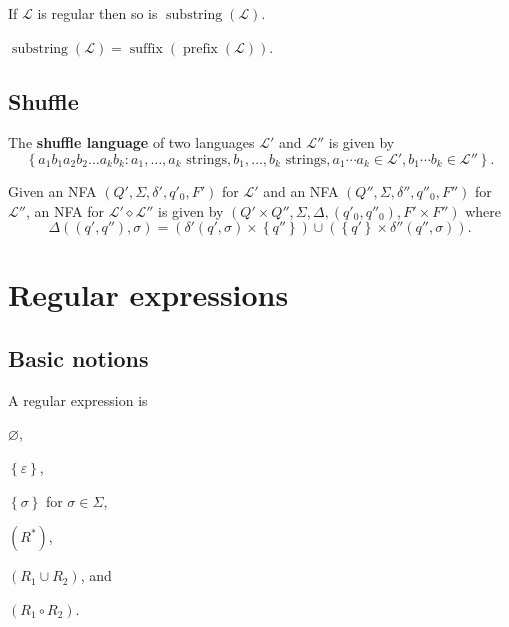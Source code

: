\documentclass{notes}
\begin{document}
\begin{thm}
  If $\mathcal L$ is regular then so is $\operatorname{substring}(\mathcal L)$.
\end{thm}

\begin{prf}
  $\operatorname{substring}(\mathcal L) = \operatorname{suffix}(\operatorname{prefix}(\mathcal L))$.
\end{prf}

\subsection{Shuffle}

\begin{defn}
  The {\boldmath \bfseries shuffle language} of two languages $\mathcal L'$ and $\mathcal L''$ is given by 
  \[
    \left \{ a_1 b_1 a_2 b_2 \dots a_k b_k : a_1, \dots, a_k \text{ strings}, b_1, \dots, b_k \text{ strings}, a_1 \cdots a_k \in \mathcal L', b_1 \cdots b_k \in \mathcal L'' \right \}.
  \]
\end{defn}

\begin{prf}
  Given an NFA $(Q', \Sigma, \delta', q'_0, F')$ for $\mathcal L'$ and an NFA $(Q'', \Sigma, \delta'', q''_0, F'')$ for $\mathcal L''$, an NFA for $\mathcal L' \diamond \mathcal L''$ is given by $(Q' \times Q'', \Sigma, \Delta, (q'_0, q''_0), F' \times F'')$ where 
  \[
    \Delta((q', q''), \sigma) = \left ( \delta'(q', \sigma) \times \left \{ q'' \right \} \right ) \cup \left ( \left \{ q' \right \} \times \delta''(q'', \sigma) \right ).
  \]
\end{prf}

\section{Regular expressions}

\subsection{Basic notions}

\begin{defn}
  A regular expression is 
  \begin{olditemize}[topsep = 0ex, itemsep = 0ex]
    \item $\varnothing$, 

    \item $\left \{ \varepsilon \right \}$, 

    \item $\left \{ \sigma \right \}$ for $\sigma \in \Sigma$, 

    \item $(R^*)$, %

    \item $(R_1 \cup R_2)$, and

    \item $(R_1 \circ R_2)$. %
  \end{olditemize}
\end{defn}
\end{document}
